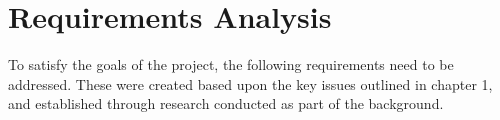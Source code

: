 \chapter{Requirements Analysis}\label{C:us}

To satisfy the goals of the project, the following requirements need to be addressed. These were created based upon the key issues outlined in chapter 1, and established through research conducted as part of the background. 








